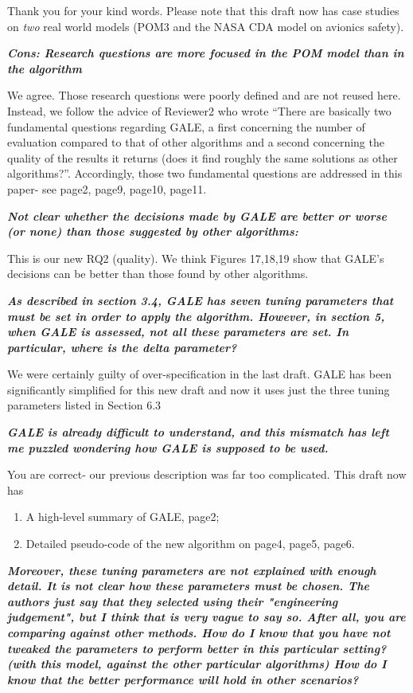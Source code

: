 \documentclass[10pt,journal,compsoc]{IEEEtran}
\newcommand{\be}{\begin{enumerate}}
\newcommand{\ee}{\end{enumerate}}
\begin{document}
Thank you for your kind words. Please note that this draft now has case studies on {\em two} real world
models (POM3 and the NASA CDA model on avionics safety).

{\bf {\em Cons: Research questions are more focused in the POM model than in the algorithm}}


We agree. Those research questions were poorly defined and are not reused here. Instead,
we follow the advice of Reviewer2 who wrote 
``There are basically two fundamental questions regarding GALE, a first concerning the number of evaluation compared to that of other algorithms and a second concerning the quality of the results it returns (does it find roughly the same solutions as other algorithms?''. Accordingly, 
those two fundamental questions are addressed
in this paper- see page2, page9, page10, page11.

{\bf {\em  Not clear whether the decisions made by GALE are better or worse (or none) than those suggested by other algorithms:}}

This is our new RQ2 (quality).  We think Figures 17,18,19 show that GALE's
decisions can be better than those found by other algorithms.


{\bf {\em 
As described in section 3.4, GALE has seven tuning parameters that must be set in order to apply the algorithm. However, in section 5, when GALE is assessed, not all these parameters are set. In particular, where is the delta parameter? }}

We were certainly guilty of over-specification in the last draft. GALE has been significantly
simplified for this new draft and now it uses just the three tuning parameters listed in Section 6.3


{\bf {\em GALE is already difficult to understand, and this mismatch has left me puzzled wondering how GALE is supposed to be used.}}

You are correct- our previous description was far too complicated.
This draft  now has 
\be
\item A high-level summary of GALE, page2;
\item Detailed pseudo-code of the new algorithm on page4, page5, page6.
\ee


{\bf {\em Moreover, these tuning parameters are not
    explained with enough detail. It is not clear
    how these parameters must be chosen. The authors
    just say that they selected using their
    "engineering judgement", but I think that is
    very vague to say so. After all, you are
    comparing against other methods. How do I know
    that you have not tweaked the parameters to
    perform better in this particular setting? (with
    this model, against the other particular
    algorithms) How do I know that the better
    performance will hold in other scenarios?}}
\end{document}
